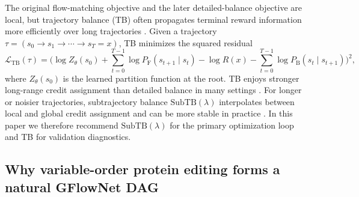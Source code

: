 \documentclass[11pt]{article}
\newcommand{\PF}{\ensuremath{P_{\mathrm F}}}
\newcommand{\PB}{\ensuremath{P_{\mathrm B}}}
\newcommand{\SubTB}{\ensuremath{\mathrm{SubTB}}}
\begin{document}
The original flow-matching objective and the later detailed-balance objective are local, but trajectory balance (TB) often propagates terminal reward information more efficiently over long trajectories \citep{bengio2023gflownet,malkin2022trajectory}. Given a trajectory $\tau=(s_0\rightarrow s_1\rightarrow\cdots\rightarrow s_T=x)$, TB minimizes the squared residual
\begin{equation}
\label{eq:tb}
\mathcal{L}_{\mathrm{TB}}(\tau)=\Bigg(\log Z_\theta(s_0)+\sum_{t=0}^{T-1}\log \PF(s_{t+1}\mid s_t)-\log R(x)-\sum_{t=0}^{T-1}\log \PB(s_t\mid s_{t+1})\Bigg)^2,
\end{equation}
where $Z_\theta(s_0)$ is the learned partition function at the root. TB enjoys stronger long-range credit assignment than detailed balance in many settings \citep{malkin2022trajectory}. For longer or noisier trajectories, subtrajectory balance $\SubTB(\lambda)$ interpolates between local and global credit assignment and can be more stable in practice \citep{madan2023subtb}. In this paper we therefore recommend $\SubTB(\lambda)$ for the primary optimization loop and TB for validation diagnostics.

\subsection{Why variable-order protein editing forms a natural GFlowNet DAG}
\end{document}
